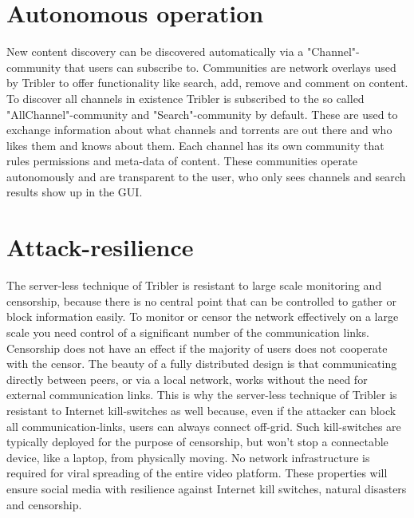 \section{Autonomous operation}
New content discovery can be discovered automatically via a "Channel"-community that users can subscribe to.
Communities are network overlays used by Tribler to offer functionality like search, add, remove and comment on content.
To discover all channels in existence Tribler is subscribed to the so called "AllChannel"-community and "Search"-community by default.
These are used to exchange information about what channels and torrents are out there and who likes them and knows about them.
Each channel has its own community that rules permissions and meta-data of content.
These communities operate autonomously and are transparent to the user, who only sees channels and search results show up in the GUI.


\section{Attack-resilience}
The server-less technique of Tribler is resistant to large scale monitoring and censorship, because there is no central point that can be controlled to gather or block information easily.
To monitor or censor the network effectively on a large scale you need control of a significant number of the communication links.
Censorship does not have an effect if the majority of users does not cooperate with the censor.
The beauty of a fully distributed design is that communicating directly between peers, or via a local network, works without the need for external communication links.
This is why the server-less technique of Tribler is resistant to Internet kill-switches as well because, even if the attacker can block all communication-links, users can always connect off-grid.
Such kill-switches are typically deployed for the purpose of censorship, but won't stop a connectable device, like a laptop, from physically moving.
No network infrastructure is required for viral spreading of the entire video platform.
These properties will ensure social media with resilience against Internet kill switches, natural disasters and censorship.


